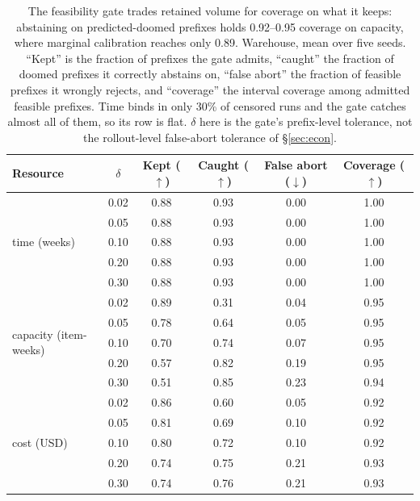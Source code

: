 \documentclass{article}
\begin{document}
\begin{table}[t]
\centering
\caption{The feasibility gate trades retained volume for coverage on what it keeps: abstaining on predicted-doomed prefixes holds 0.92--0.95 coverage on capacity, where marginal calibration reaches only 0.89. Warehouse, mean over five seeds. ``Kept'' is the fraction of prefixes the gate admits, ``caught'' the fraction of doomed prefixes it correctly abstains on, ``false abort'' the fraction of feasible prefixes it wrongly rejects, and ``coverage'' the interval coverage among admitted feasible prefixes. Time binds in only 30\% of censored runs and the gate catches almost all of them, so its row is flat. $\delta$ here is the gate's prefix-level tolerance, not the rollout-level false-abort tolerance of \S\ref{sec:econ}.}
\label{tab:gated}
\small
\begin{tabular}{@{}lccccc@{}}
\toprule
Resource & $\delta$ & Kept ($\uparrow$) & Caught ($\uparrow$) & False abort ($\downarrow$) & Coverage ($\uparrow$) \\
\midrule
\multirow{5}{*}{time (weeks)}
 & 0.02 & 0.88 & 0.93 & 0.00 & 1.00 \\
 & 0.05 & 0.88 & 0.93 & 0.00 & 1.00 \\
 & 0.10 & 0.88 & 0.93 & 0.00 & 1.00 \\
 & 0.20 & 0.88 & 0.93 & 0.00 & 1.00 \\
 & 0.30 & 0.88 & 0.93 & 0.00 & 1.00 \\
\midrule
\multirow{5}{*}{capacity (item-weeks)}
 & 0.02 & 0.89 & 0.31 & 0.04 & 0.95 \\
 & 0.05 & 0.78 & 0.64 & 0.05 & 0.95 \\
 & 0.10 & 0.70 & 0.74 & 0.07 & 0.95 \\
 & 0.20 & 0.57 & 0.82 & 0.19 & 0.95 \\
 & 0.30 & 0.51 & 0.85 & 0.23 & 0.94 \\
\midrule
\multirow{5}{*}{cost (USD)}
 & 0.02 & 0.86 & 0.60 & 0.05 & 0.92 \\
 & 0.05 & 0.81 & 0.69 & 0.10 & 0.92 \\
 & 0.10 & 0.80 & 0.72 & 0.10 & 0.92 \\
 & 0.20 & 0.74 & 0.75 & 0.21 & 0.93 \\
 & 0.30 & 0.74 & 0.76 & 0.21 & 0.93 \\
\bottomrule
\end{tabular}
\end{table}
\end{document}
